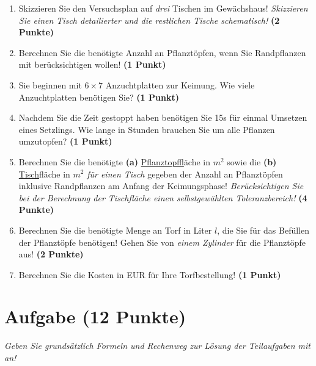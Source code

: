 \documentclass[a4paper, 9pt]{scrartcl}\usepackage[]{graphicx}\usepackage[]{xcolor}
\begin{document}
\begin{enumerate}
\item Skizzieren Sie den Versuchsplan auf \textit{drei} Tischen im Gewächshaus! \textit{Skizzieren Sie einen Tisch detailierter und die restlichen Tische schematisch!} \textbf{(2 Punkte)}
\item Berechnen Sie die benötigte Anzahl an Pflanztöpfen, wenn Sie Randpflanzen mit berücksichtigen wollen! \textbf{(1 Punkt)}
\item Sie beginnen mit $6 \times 7$ Anzuchtplatten zur Keimung. Wie viele Anzuchtplatten benötigen Sie? \textbf{(1 Punkt)}
\item Nachdem Sie die Zeit gestoppt haben benötigen Sie 15s für einmal Umsetzen eines Setzlings. Wie lange in Stunden brauchen Sie um alle Pflanzen umzutopfen? \textbf{(1 Punkt)}
\item Berechnen Sie die benötigte \textbf{(a)} \underline{Pflanztopf}fläche in $m^2$ sowie die \textbf{(b)} \underline{Tisch}fläche in $m^2$ \textit{für einen Tisch} gegeben der Anzahl an Pflanztöpfen inklusive Randpflanzen am Anfang der Keimungsphase! \textit{Berücksichtigen Sie bei der Berechnung der Tischfläche einen selbstgewählten Toleranzbereich!} \textbf{(4 Punkte)}
\item Berechnen Sie die benötigte Menge an Torf in Liter $l$, die Sie für das Befüllen der Pflanztöpfe benötigen! Gehen Sie von \textit{einem Zylinder} für die Pflanztöpfe aus!  \textbf{(2 Punkte)}
\item Berechnen Sie die Kosten in EUR für Ihre Torfbestellung! \textbf{(1 Punkt)}
\end{enumerate}




 
\clearpage

\section{Aufgabe \hfill (12 Punkte)}

\textit{Geben Sie grundsätzlich Formeln und Rechenweg zur Lösung der Teilaufgaben mit an!} \\[1Ex]
 
\end{document}
